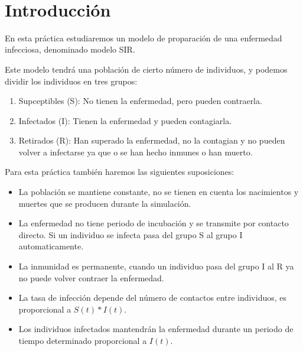 \documentclass[12pt, spanish]{article}
\makeatletter
\let\thedate\@date
\makeatother
\begin{document}
\begin{titlepage}
    {\large \thedate}\\[0.5cm]
    {\doclicenseThis}

    \vfill

\end{titlepage}


\tableofcontents
\pagebreak



\section*{Introducción}

En esta práctica estudiaremos un modelo de proparación de una enfermedad infecciosa, denominado modelo SIR.

Este modelo tendrá una población de cierto número de individuos, y podemos dividir los individuos en tres grupos:

\begin{enumerate}
	\item Supceptibles (S): No tienen la enfermedad, pero pueden contraerla.
	\item Infectados (I): Tienen la enfermedad y pueden contagiarla.
	\item Retirados (R): Han superado la enfermedad, no la contagian y no pueden volver a infectarse ya que o se han hecho inmunes o han muerto.
\end{enumerate}

Para esta práctica también haremos las siguientes suposiciones:

\begin{itemize}
	\item La población se mantiene constante, no se tienen en cuenta los nacimientos y muertes que se producen durante la simulación.
	\item La enfermedad no tiene periodo de incubación y se transmite por contacto directo. Si un individuo se infecta pasa del grupo S al grupo I automaticamente.
	\item La inmunidad es permanente, cuando un individuo pasa del grupo I al R ya no puede volver contraer la enfermedad.
	\item La tasa de infección depende del número de contactos entre individuos, es proporcional a $S(t) * I(t)$.
	\item Los individuos infectados mantendrán la enfermedad durante un periodo de tiempo determinado proporcional a $I(t)$.
\end{itemize}
\end{document}
